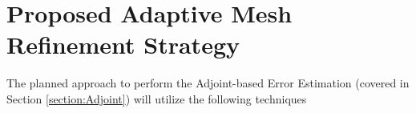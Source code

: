 \documentclass[titlepage,11pt,letterpaper]{article}
\numberwithin{equation}{subsection}
\begin{document}
\thispagestyle{empty}\titleRR
\clearpage
\setcounter{page}{1}


\newpage





\section{Proposed Adaptive Mesh Refinement Strategy}

The planned approach to perform the Adjoint-based Error Estimation (covered in Section \ref{section:Adjoint}) will utilize the following techniques










\end{document}
